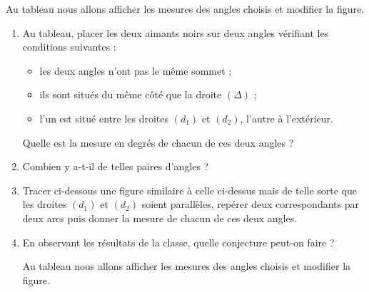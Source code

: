 \begin{activite}
{\begin{enumerate}
      Au tableau nous allons afficher les mesures des angles choisis et modifier la figure.
      \par\pointilles[\linewidth]
      \par\pointilles[\linewidth]         
   \end{enumerate}
   \vspace*{-10mm}
      \begin{enumerate}
         \item Au tableau, placer les deux aimants noirs sur deux angles vérifiant les conditions suivantes :
            \begin{itemize}
               \item les deux angles n'ont pas le même sommet ;
               \item ils sont situés du même côté que la droite $(\Delta)$ ;
               \item l'un est situé \og entre \fg{} les droites $(d_1)$ et $(d_2)$, l'autre à l'extérieur.
            \end{itemize}
         Quelle est la mesure en degrés de chacun de ces deux angles ?
         \par\pointilles[\linewidth]
         \par\pointilles[\linewidth]
         \par\pointilles[\linewidth]
         \item Combien y a-t-il de telles paires d'angles ?
         \par\pointilles[\linewidth]
         \begin{center}
         \end{center}
         \item  Tracer ci-dessous une figure similaire à celle ci-dessus mais de telle sorte que les droites $(d_1)$ et $(d_2)$ soient parallèles, repérer deux correspondants par deux arcs puis donner la mesure de chacun de ces deux angles.
         \par\vspace*{40mm}
         \item En observant les résultats de la classe, quelle conjecture peut-on faire ?
          
         Au tableau nous allons afficher les mesures des angles choisis et modifier la figure.
         \par\pointilles[\linewidth]
         \par\pointilles[\linewidth]         
      \end{enumerate}
   }
 \end{activite}